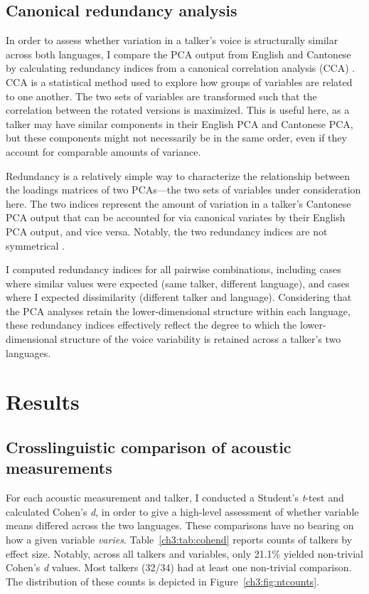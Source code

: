 \subsection{Canonical redundancy analysis}

In order to assess whether variation in a talker's voice is structurally similar across both languages, I compare the PCA output from English and Cantonese by calculating redundancy indices from a canonical correlation analysis (CCA) \citep{stewart_1968_canonical,jolliffe_2002_pca}. CCA is a statistical method used to explore how groups of variables are related to one another. The two sets of variables are transformed such that the correlation between the rotated versions is maximized. This is useful here, as a talker may have similar components in their English PCA and Cantonese PCA, but these components might not necessarily be in the same order, even if they account for comparable amounts of variance. 

Redundancy is a relatively simple way to characterize the relationship between the loadings matrices of two PCAs---the two sets of variables under consideration here. The two indices represent the amount of variation in a talker's Cantonese PCA output that can be accounted for via canonical variates by their English PCA output, and vice versa. Notably, the two redundancy indices are not symmetrical \citep{stewart_1968_canonical}.

I computed redundancy indices for all pairwise combinations, including cases where similar values were expected (same talker, different language), and cases where I expected dissimilarity (different talker and language). Considering that the PCA analyses retain the lower-dimensional structure within each language, these redundancy indices effectively reflect the degree to which the lower-dimensional structure of the voice variability is retained across a talker's two languages.

\section{Results}\label{ch3:sec:results}

\subsection{Crosslinguistic comparison of acoustic measurements}

For each acoustic measurement and talker, I conducted a Student's \textit{t}-test and calculated Cohen's \textit{d}, in order to give a high-level assessment of whether variable means differed across the two languages. These comparisons have no bearing on how a given variable \textit{varies}. Table~\ref{ch3:tab:cohend} reports counts of talkers by effect size. Notably, across all talkers and variables, only 21.1\% yielded non-trivial Cohen's \textit{d} values. Most talkers (32/34) had at least one non-trivial comparison. The distribution of these counts is depicted in Figure~\ref{ch3:fig:ntcounts}. 

